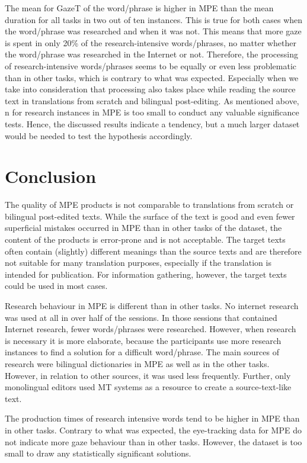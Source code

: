\documentclass[output=paper]{langsci/langscibook}
\begin{document}
The mean for GazeT of the word/phrase is higher in MPE than the mean duration for all tasks in two out of ten instances. This is true for both cases when the word/phrase was researched and when it was not. This means that more gaze is spent in only 20\% of the research-intensive words/phrases, no matter whether the word/phrase was researched in the Internet or not. Therefore, the processing of research-intensive words/phrases seems to be equally or even less problematic than in other tasks, which is contrary to what was expected. Especially when we take into consideration that processing also takes place while reading the source text in translations from scratch and bilingual post-editing. As mentioned above, n for research instances in MPE is too small to conduct any valuable significance tests. Hence, the discussed results indicate a tendency, but a much larger dataset would be needed to test the hypothesis accordingly.


\section{Conclusion\label{nitzke:sec:Conclusion}}

The quality of MPE products is not comparable to translations from scratch or bilingual post-edited texts. While the surface of the text is good and even fewer superficial mistakes occurred in MPE than in other tasks of the dataset, the content of the products is error-prone and is not acceptable. The target texts often contain (slightly) different meanings than the source texts and are therefore not suitable for many translation purposes, especially if the translation is intended for publication. For information gathering, however, the target texts could be used in most cases.


Research behaviour in MPE is different than in other tasks. No internet research was used at all in over half of the sessions. In those sessions that contained Internet research, fewer words/phrases were researched. However, when research is necessary it is more elaborate, because the participants use more research instances to find a solution for a difficult word/phrase. The main sources of research were bilingual dictionaries in MPE as well as in the other tasks. However, in relation to other sources, it was used less frequently. Further, only monolingual editors used MT systems as a resource to create a source-text-like text.



The production times of research intensive words tend to be higher in MPE than in other tasks. Contrary to what was expected, the eye-tracking data for MPE do not indicate more gaze behaviour than in other tasks. However, the dataset is too small to draw any statistically significant solutions.
\end{document}
